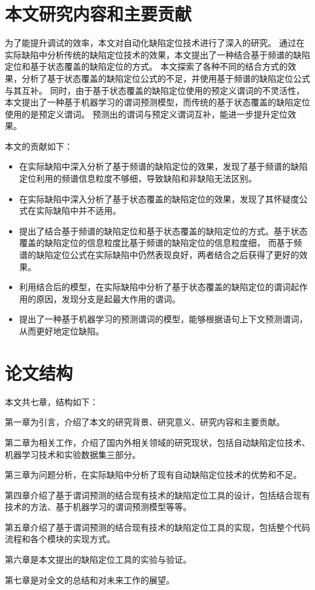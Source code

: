 \section{本文研究内容和主要贡献}

为了能提升调试的效率，本文对自动化缺陷定位技术进行了深入的研究。
通过在实际缺陷中分析传统的缺陷定位技术的效果，本文提出了一种结合基于频谱的缺陷定位和基于状态覆盖的缺陷定位的方式。
本文探索了各种不同的结合方式的效果，分析了基于状态覆盖的缺陷定位公式的不足，并使用基于频谱的缺陷定位公式与其互补。
同时，由于基于状态覆盖的缺陷定位使用的预定义谓词的不灵活性，
本文提出了一种基于机器学习的谓词预测模型，而传统的基于状态覆盖的缺陷定位使用的是预定义谓词。
预测出的谓词与预定义谓词互补，能进一步提升定位效果。

本文的贡献如下：
\begin{itemize}
\item 在实际缺陷中深入分析了基于频谱的缺陷定位的效果，发现了基于频谱的缺陷定位利用的频谱信息粒度不够细，导致缺陷和非缺陷无法区别。
\item 在实际缺陷中深入分析了基于状态覆盖的缺陷定位的效果，发现了其怀疑度公式在实际缺陷中并不适用。
\item 提出了结合基于频谱的缺陷定位和基于状态覆盖的缺陷定位的方式。基于状态覆盖的缺陷定位的信息粒度比基于频谱的缺陷定位的信息粒度细，
而基于频谱的缺陷定位公式在实际缺陷中仍然表现良好，两者结合之后获得了更好的效果。
\item 利用结合后的模型，在实际缺陷中分析了基于状态覆盖的缺陷定位的谓词起作用的原因，发现分支是起最大作用的谓词。
\item 提出了一种基于机器学习的预测谓词的模型，能够根据语句上下文预测谓词，从而更好地定位缺陷。
\end{itemize}

\section{论文结构}

本文共七章，结构如下：

第一章为引言，介绍了本文的研究背景、研究意义、研究内容和主要贡献。

第二章为相关工作，介绍了国内外相关领域的研究现状，包括自动缺陷定位技术、机器学习技术和实验数据集三部分。

第三章为问题分析，在实际缺陷中分析了现有自动缺陷定位技术的优势和不足。

第四章介绍了基于谓词预测的结合现有技术的缺陷定位工具的设计，包括结合现有技术的方法、基于机器学习的谓词预测模型等等。

第五章介绍了基于谓词预测的结合现有技术的缺陷定位工具的实现，包括整个代码流程和各个模块的实现方式。

第六章是本文提出的缺陷定位工具的实验与验证。

第七章是对全文的总结和对未来工作的展望。

